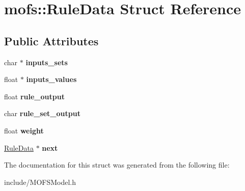 \hypertarget{structmofs_1_1RuleData}{\section{mofs\-:\-:Rule\-Data Struct Reference}
\label{structmofs_1_1RuleData}
}
\subsection*{Public Attributes}
\begin{DoxyCompactItemize}
\item 
\hypertarget{structmofs_1_1RuleData_a11c654c99b4f999ba7dc822019bff776}{char $\ast$ {\bfseries inputs\-\_\-sets}}\label{structmofs_1_1RuleData_a11c654c99b4f999ba7dc822019bff776}

\item 
\hypertarget{structmofs_1_1RuleData_ac84e95feb845959e2c67e613cfb6386a}{float $\ast$ {\bfseries inputs\-\_\-values}}\label{structmofs_1_1RuleData_ac84e95feb845959e2c67e613cfb6386a}

\item 
\hypertarget{structmofs_1_1RuleData_a52d61ad2b2b8bbc483e3addffd31bce7}{float {\bfseries rule\-\_\-output}}\label{structmofs_1_1RuleData_a52d61ad2b2b8bbc483e3addffd31bce7}

\item 
\hypertarget{structmofs_1_1RuleData_a993e07d60ebeee72868b5cf5f91452a5}{char {\bfseries rule\-\_\-set\-\_\-output}}\label{structmofs_1_1RuleData_a993e07d60ebeee72868b5cf5f91452a5}

\item 
\hypertarget{structmofs_1_1RuleData_a823777c544b3e6fffee00bcb80e8d827}{float {\bfseries weight}}\label{structmofs_1_1RuleData_a823777c544b3e6fffee00bcb80e8d827}

\item 
\hypertarget{structmofs_1_1RuleData_ac90780a87b2cb264a859a0d8d3410a21}{\hyperlink{structmofs_1_1RuleData}{Rule\-Data} $\ast$ {\bfseries next}}\label{structmofs_1_1RuleData_ac90780a87b2cb264a859a0d8d3410a21}

\end{DoxyCompactItemize}


The documentation for this struct was generated from the following file\-:\begin{DoxyCompactItemize}
\item 
include/M\-O\-F\-S\-Model.\-h\end{DoxyCompactItemize}
